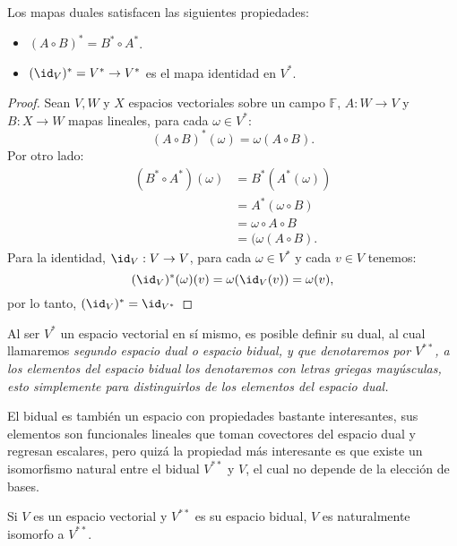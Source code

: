 \begin{lemma}
	Los mapas duales satisfacen las siguientes propiedades:
	\begin{itemize}
		\item $(A \circ B)^{*} = B^{*} \circ A^{*}$.
		\item $(\id_V)^{*} = V^{*} \to V^{*}$ es el mapa identidad en $V^{*}$.
	\end{itemize}
\end{lemma}

\begin{proof}
	Sean $V,W$ y $X$ espacios vectoriales sobre un campo $\mathbb{F}$, $A: W \to V$ y $B: X \to W$ mapas lineales, para cada $\omega \in V^{*}$:
	\[ (A\circ B)^{*}(\omega) = \omega(A \circ B). \]
	Por otro lado:
	\begin{align*}
		(B^* \circ A^*)(\omega) & = B^{*}(A^*(\omega))     \\
		                        & = A^{*}(\omega \circ B)  \\
		                        & = \omega \circ A \circ B \\
		                        & = (\omega (A \circ B).
	\end{align*}
	Para la identidad, $\id_V: V \to V$, para cada $\omega \in V^{*}$ y cada $v \in V$ tenemos:
	\[
		(\id_V)^{*}(\omega)(v) = \omega(\id_V(v)) = \omega(v),
	\]
  por lo tanto, $(\id_V)^{*} = \id_{V^{*}}$
\end{proof}

Al ser $V^{*}$ un espacio vectorial en sí mismo, es posible definir su dual, al cual llamaremos \it{segundo espacio dual} o \it{espacio bidual}, y que denotaremos por $V^{**}$, a los elementos del espacio bidual los denotaremos con letras griegas mayúsculas, esto simplemente para distinguirlos de los elementos del espacio dual.

El bidual es también un espacio con propiedades bastante interesantes, sus elementos son funcionales lineales que toman covectores del espacio dual y regresan escalares, pero quizá la propiedad más interesante es que existe un isomorfismo natural entre el bidual $V^{**}$ y $V$, el cual no depende de la elección de bases.

\begin{theorem}
	Si $V$ es un espacio vectorial y $V^{**}$ es su espacio bidual, $V$ es naturalmente isomorfo a $V^{**}$.
\end{theorem}


